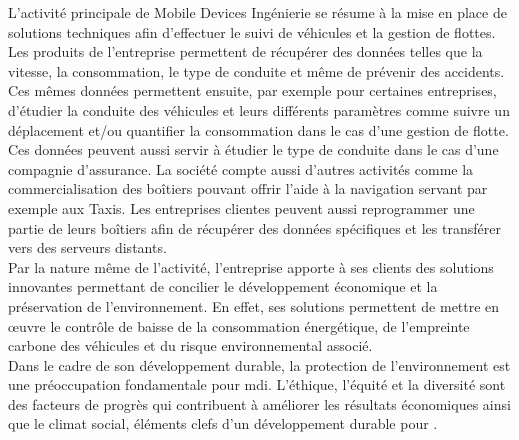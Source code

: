             L’activité principale de Mobile Devices Ingénierie se résume à la mise en place de solutions techniques 
            afin d’effectuer le suivi de véhicules et la gestion de flottes. Les produits de l'entreprise permettent 
            de récupérer des données telles que la vitesse, la consommation, le type de conduite et même de prévenir 
            des accidents.
            Ces mêmes données permettent ensuite, par exemple pour certaines entreprises, d’étudier la conduite 
            des véhicules et leurs différents paramètres comme suivre un déplacement et/ou quantifier la consommation 
            dans le cas d’une gestion de flotte. \\
            Ces données peuvent aussi servir à étudier le type de conduite dans le cas d’une compagnie d’assurance. 
            La société compte aussi d'autres activités comme la commercialisation des boîtiers pouvant offrir l’aide 
            à la navigation servant par exemple aux Taxis.
            Les entreprises clientes peuvent aussi reprogrammer une partie de leurs boîtiers afin de récupérer des données 
            spécifiques et les transférer vers des serveurs distants. \\[0.3cm]

            Par la nature même de l’activité, l’entreprise apporte à ses clients des solutions
            innovantes permettant de concilier le développement économique et la préservation de l’environnement.
            En effet, ses solutions permettent de mettre en œuvre le contrôle
            de baisse de la consommation énergétique, de l’empreinte carbone des
            véhicules et du risque environnemental associé.\\[0.3cm]
            Dans le cadre de son développement durable, la protection de l’environnement est une
            préoccupation fondamentale pour \gls{mdi}. L’éthique, l’équité et la diversité sont des
            facteurs de progrès qui contribuent à améliorer les résultats économiques ainsi que le
            climat social, éléments clefs d’un développement durable pour \company{}.

